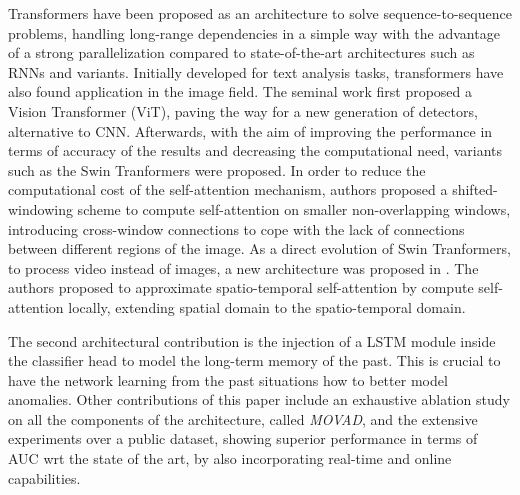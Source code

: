 Transformers \cite{vaswani2017attention} have been proposed as an architecture to solve sequence-to-sequence problems, handling long-range dependencies in a simple way with the advantage of a strong parallelization compared to state-of-the-art architectures such as RNNs and variants.
Initially developed for text analysis tasks, transformers have also found application in the image field.
The seminal work \cite{DBLP:conf/iclr/DosovitskiyB0WZ21} first proposed a Vision Transformer (ViT), paving the way for a new generation of detectors, alternative to CNN.
Afterwards, with the aim of improving the performance in terms of accuracy of the results and decreasing the computational need, variants such as the Swin Tranformers \cite{liu2021Swin} were proposed. In order to reduce the computational cost of the self-attention mechanism, authors proposed a shifted-windowing scheme to compute self-attention on smaller non-overlapping windows, introducing cross-window connections to cope with the lack of connections between different regions of the image.
As a direct evolution of Swin Tranformers, to process video instead of images, a new architecture was proposed in \cite{liu_video_2022}. The authors proposed to approximate spatio-temporal self-attention by compute self-attention locally, extending spatial domain to the spatio-temporal domain. 

The second architectural contribution is the injection of a LSTM module inside the classifier head to model the long-term memory of the past. This is crucial to have the network learning from the past situations how to better model anomalies. Other contributions of this paper include an exhaustive ablation study on all the components of the architecture, called \emph{MOVAD}, and the extensive experiments over a public dataset, showing superior performance in terms of AUC wrt the state of the art, by also incorporating real-time and online capabilities. 